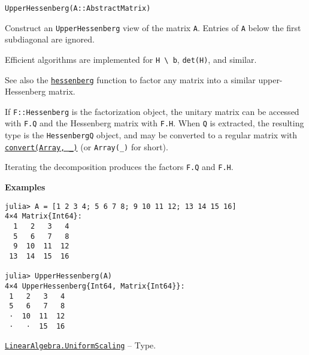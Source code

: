 \begin{adjustwidth}{2em}{0pt}


\begin{verbatim}
UpperHessenberg(A::AbstractMatrix)
\end{verbatim}

Construct an \texttt{UpperHessenberg} view of the matrix \texttt{A}. Entries of \texttt{A} below the first subdiagonal are ignored.

Efficient algorithms are implemented for \texttt{H {\textbackslash} b}, \texttt{det(H)}, and similar.

See also the \hyperlink{14451165250498024497}{\texttt{hessenberg}} function to factor any matrix into a similar upper-Hessenberg matrix.

If \texttt{F::Hessenberg} is the factorization object, the unitary matrix can be accessed with \texttt{F.Q} and the Hessenberg matrix with \texttt{F.H}. When \texttt{Q} is extracted, the resulting type is the \texttt{HessenbergQ} object, and may be converted to a regular matrix with \hyperlink{1846942650946171605}{\texttt{convert(Array, \_)}} (or \texttt{Array(\_)} for short).

Iterating the decomposition produces the factors \texttt{F.Q} and \texttt{F.H}.

\textbf{Examples}


\begin{verbatim}
julia> A = [1 2 3 4; 5 6 7 8; 9 10 11 12; 13 14 15 16]
4×4 Matrix{Int64}:
  1   2   3   4
  5   6   7   8
  9  10  11  12
 13  14  15  16

julia> UpperHessenberg(A)
4×4 UpperHessenberg{Int64, Matrix{Int64}}:
 1   2   3   4
 5   6   7   8
 ⋅  10  11  12
 ⋅   ⋅  15  16
\end{verbatim}



\end{adjustwidth}
\hypertarget{723087258311673942}{}
\hyperlink{723087258311673942}{\texttt{LinearAlgebra.UniformScaling}}  -- {Type.}

